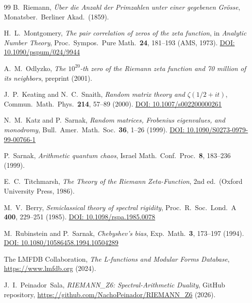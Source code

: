 \documentclass[12pt,a4paper]{article}
\theoremstyle{plain}
\theoremstyle{definition}
\theoremstyle{remark}
\begin{document}
\begin{thebibliography}{99}
B.~Riemann, \emph{Über die Anzahl der Primzahlen unter einer gegebenen Grösse}, Monatsber.\ Berliner Akad.\ (1859).

H.~L.~Montgomery, \emph{The pair correlation of zeros of the zeta function}, in \emph{Analytic Number Theory}, Proc.\ Sympos.\ Pure Math.\ \textbf{24}, 181--193 (AMS, 1973). \href{https://doi.org/10.1090/pspum/024/9944}{DOI: 10.1090/pspum/024/9944}

A.~M.~Odlyzko, \emph{The \(10^{20}\)-th zero of the Riemann zeta function and 70 million of its neighbors}, preprint (2001).

J.~P.~Keating and N.~C.~Snaith, \emph{Random matrix theory and \(\zeta(1/2+it)\)}, Commun.\ Math.\ Phys.\ \textbf{214}, 57--89 (2000). \href{https://doi.org/10.1007/s002200000261}{DOI: 10.1007/s002200000261}

N.~M.~Katz and P.~Sarnak, \emph{Random matrices, Frobenius eigenvalues, and monodromy}, Bull.\ Amer.\ Math.\ Soc.\ \textbf{36}, 1--26 (1999). \href{https://doi.org/10.1090/S0273-0979-99-00766-1}{DOI: 10.1090/S0273-0979-99-00766-1}

P.~Sarnak, \emph{Arithmetic quantum chaos}, Israel Math.\ Conf.\ Proc.\ \textbf{8}, 183--236 (1999).

E.~C.~Titchmarsh, \emph{The Theory of the Riemann Zeta-Function}, 2nd ed.\ (Oxford University Press, 1986).

M.~V.~Berry, \emph{Semiclassical theory of spectral rigidity}, Proc.\ R.\ Soc.\ Lond.\ A \textbf{400}, 229--251 (1985). \href{https://doi.org/10.1098/rspa.1985.0078}{DOI: 10.1098/rspa.1985.0078}

M.~Rubinstein and P.~Sarnak, \emph{Chebyshev's bias}, Exp.\ Math.\ \textbf{3}, 173--197 (1994). \href{https://doi.org/10.1080/10586458.1994.10504289}{DOI: 10.1080/10586458.1994.10504289}

 The LMFDB Collaboration, \emph{The L-functions and Modular Forms Database}, \url{https://www.lmfdb.org} (2024).

 J.~I.~Peinador~Sala, \emph{RIEMANN\_Z6: Spectral-Arithmetic Duality}, GitHub repository, \url{https://github.com/NachoPeinador/RIEMANN_Z6} (2026).
\end{thebibliography}
\end{document}
